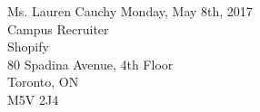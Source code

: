 \documentclass[]{deedy-resume-openfont}
\begin{document}
%
%



%
%

\begin{minipage}{0.80\textwidth}
\leavevmode \newline
\leavevmode \newline

Ms. Lauren Cauchy
\hspace{50ex} Monday, May 8th, 2017\\                    
Campus Recruiter \\
Shopify \\
80 Spadina Avenue, 4th Floor \\
Toronto, ON \\
M5V 2J4 \\
\sectionsep

\end{minipage}

\leavevmode \newline
\end{document}
